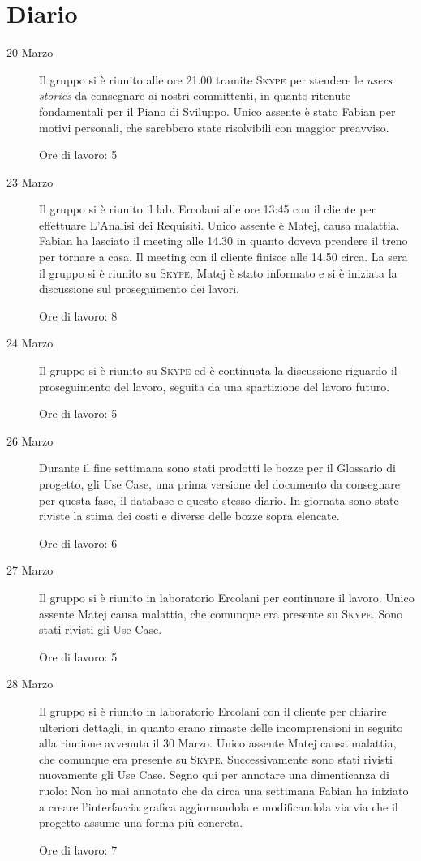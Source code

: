 \section{Diario}
\begin{description}
\item[20 Marzo] Il gruppo si è riunito alle ore 21.00 tramite \textsc{Skype} per stendere le 
	\textit{users stories} da consegnare ai nostri committenti, in quanto ritenute
	fondamentali per il Piano di Sviluppo.
	Unico assente è stato Fabian per motivi personali, che sarebbero state 
	risolvibili con maggior preavviso.
	\medskip
	
	Ore di lavoro: 5
	\bigskip
	
\item[23 Marzo] Il gruppo si è riunito il lab. Ercolani alle ore 13:45 con il 
	cliente per effettuare L'Analisi dei Requisiti.
	Unico assente è Matej, causa malattia.
	Fabian ha lasciato il meeting alle 14.30 in quanto doveva prendere il
	treno per tornare a casa.
	Il meeting con il cliente finisce alle 14.50 circa.
	La sera il gruppo si è riunito su \textsc{Skype}, Matej è stato informato 
	e si è iniziata la discussione sul proseguimento dei lavori.
	\medskip
	
	Ore di lavoro: 8
	\bigskip
	
\item[24 Marzo] Il gruppo si è riunito su \textsc{Skype} ed è continuata la discussione 
	riguardo il proseguimento del lavoro, seguita da una spartizione del lavoro futuro.
	\medskip
	
	Ore di lavoro: 5
	\bigskip
	
\item[26 Marzo]
	Durante il fine settimana sono stati prodotti le bozze per il Glossario 
	di progetto,  gli Use Case,  una prima 
	versione del documento da consegnare per questa fase, il database e 
	questo stesso diario. In giornata sono state riviste la stima dei costi 
	e diverse delle bozze sopra elencate.
	\medskip
	
	Ore di lavoro: 6
	\bigskip
	
\item[27 Marzo]
	Il gruppo si è riunito in laboratorio Ercolani per continuare il lavoro.
	Unico assente  Matej causa malattia, che comunque era presente su \textsc{Skype}. 
	Sono stati rivisti gli Use Case.
\medskip

	Ore di lavoro: 5
	\bigskip
	
\item[28 Marzo] 
Il gruppo si è riunito in laboratorio Ercolani con il cliente per chiarire ulteriori
 dettagli, in quanto erano rimaste delle incomprensioni in seguito alla riunione 
 avvenuta il 30 Marzo.
Unico assente  Matej causa malattia, che comunque era presente su \textsc{Skype}.
Successivamente sono stati rivisti nuovamente gli Use Case.
Segno qui per annotare una dimenticanza di ruolo: Non ho mai annotato che da 
circa una settimana Fabian ha iniziato a creare l'interfaccia grafica 
aggiornandola e modificandola via via che il progetto assume una forma più 
concreta.
\medskip

	Ore di lavoro: 7
\end{description}
